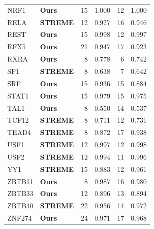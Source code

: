 \begin{table}[!ht]
\begin{tabular}{llrrrr}
NRF1 & \textbf{Ours} & 15 & 1.000 & 12 & 1.000 \\
RELA & \textbf{STREME} & 12 & 0.927 & 16 & 0.946 \\
REST & \textbf{Ours} & 15 & 0.998 & 12 & 0.997 \\
RFX5 & \textbf{Ours} & 21 & 0.947 & 17 & 0.923 \\
RXRA & \textbf{Ours} & 8 & 0.778 & 6 & 0.742 \\
SP1 & \textbf{STREME} & 8 & 0.638 & 7 & 0.642 \\
SRF & \textbf{Ours} & 15 & 0.936 & 15 & 0.884 \\
STAT1 & \textbf{Ours} & 15 & 0.979 & 15 & 0.975 \\
TAL1 & \textbf{Ours} & 8 & 0.550 & 14 & 0.537 \\
TCF12 & \textbf{STREME} & 8 & 0.711 & 12 & 0.731 \\
TEAD4 & \textbf{STREME} & 8 & 0.872 & 17 & 0.938 \\
USF1 & \textbf{STREME} & 12 & 0.997 & 12 & 0.998 \\
USF2 & \textbf{STREME} & 12 & 0.994 & 11 & 0.996 \\
YY1 & \textbf{STREME} & 15 & 0.883 & 12 & 0.961 \\
ZBTB11 & \textbf{Ours} & 8 & 0.987 & 16 & 0.980 \\
ZBTB33 & \textbf{Ours} & 12 & 0.896 & 13 & 0.894 \\
ZBTB40 & \textbf{STREME} & 22 & 0.956 & 14 & 0.972 \\
ZNF274 & \textbf{Ours} & 24 & 0.971 & 17 & 0.968 \\
\bottomrule
\end{tabular}
\end{table}